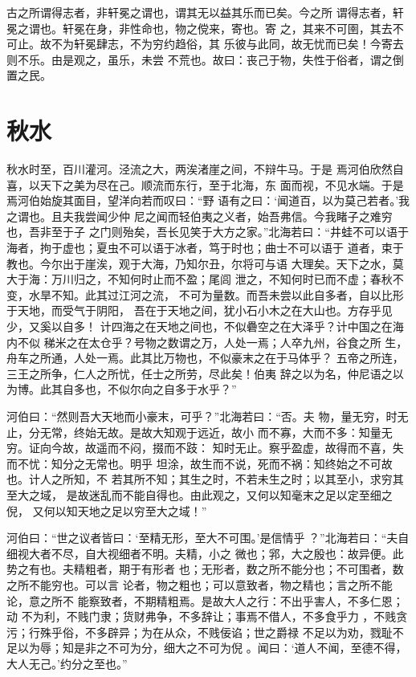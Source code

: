 \documentclass[12pt,UTF8]{ctexbook}
\begin{document}
古之所谓得志者，非轩冕之谓也，谓其无以益其乐而已矣。今之所 谓得志者，轩冕之谓也。轩冕在身，非性命也，物之傥来，寄也。寄 之，其来不可圉，其去不可止。故不为轩冕肆志，不为穷约趋俗，其 乐彼与此同，故无忧而已矣！今寄去则不乐。由是观之，虽乐，未尝 不荒也。故曰：丧己于物，失性于俗者，谓之倒置之民。
\section{秋水}

秋水时至，百川灌河。泾流之大，两涘渚崖之间，不辩牛马。于是 焉河伯欣然自喜，以天下之美为尽在己。顺流而东行，至于北海，东 面而视，不见水端。于是焉河伯始旋其面目，望洋向若而叹曰：“野 语有之曰：‘闻道百，以为莫己若者。’我之谓也。且夫我尝闻少仲 尼之闻而轻伯夷之义者，始吾弗信。今我睹子之难穷也，吾非至于子 之门则殆矣，吾长见笑于大方之家。”北海若曰：“井蛙不可以语于海者，拘于虚也；夏虫不可以语于冰者，笃于时也；曲士不可以语于 道者，束于教也。今尔出于崖涘，观于大海，乃知尔丑，尔将可与语 大理矣。天下之水，莫大于海：万川归之，不知何时止而不盈；尾闾 泄之，不知何时已而不虚；春秋不变，水旱不知。此其过江河之流， 不可为量数。而吾未尝以此自多者，自以比形于天地，而受气于阴阳， 吾在于天地之间，犹小石小木之在大山也。方存乎见少，又奚以自多！ 计四海之在天地之间也，不似礨空之在大泽乎？计中国之在海内不似 稊米之在太仓乎？号物之数谓之万，人处一焉；人卒九州，谷食之所 生，舟车之所通，人处一焉。此其比万物也，不似豪末之在于马体乎？ 五帝之所连，三王之所争，仁人之所忧，任士之所劳，尽此矣！伯夷 辞之以为名，仲尼语之以为博。此其自多也，不似尔向之自多于水乎？”

河伯曰：“然则吾大天地而小豪末，可乎？”北海若曰：“否。夫 物，量无穷，时无止，分无常，终始无故。是故大知观于远近，故小 而不寡，大而不多：知量无穷。证向今故，故遥而不闷，掇而不跂： 知时无止。察乎盈虚，故得而不喜，失而不忧：知分之无常也。明乎 坦涂，故生而不说，死而不祸：知终始之不可故也。计人之所知，不 若其所不知；其生之时，不若未生之时；以其至小，求穷其至大之域， 是故迷乱而不能自得也。由此观之，又何以知毫末之足以定至细之倪， 又何以知天地之足以穷至大之域！”

河伯曰：“世之议者皆曰：‘至精无形，至大不可围。’是信情乎 ？”北海若曰：“夫自细视大者不尽，自大视细者不明。夫精，小之 微也；郛，大之殷也：故异便。此势之有也。夫精粗者，期于有形者 也；无形者，数之所不能分也；不可围者，数之所不能穷也。可以言 论者，物之粗也；可以意致者，物之精也；言之所不能论，意之所不 能察致者，不期精粗焉。是故大人之行：不出乎害人，不多仁恩；动 不为利，不贱门隶；货财弗争，不多辞让；事焉不借人，不多食乎力 ，不贱贪污；行殊乎俗，不多辟异；为在从众，不贱佞谄；世之爵禄 不足以为劝，戮耻不足以为辱；知是非之不可为分，细大之不可为倪 。闻曰：‘道人不闻，至德不得，大人无己。’约分之至也。”
\end{document}
